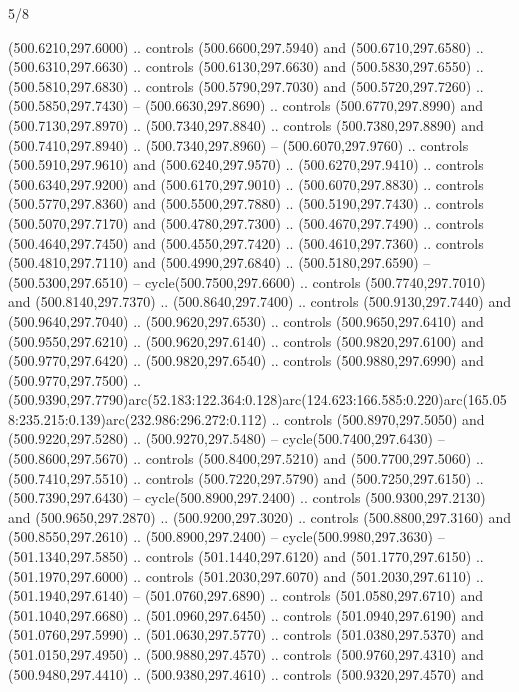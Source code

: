 \begin{flagdescription}{5/8}
\begin{scope}[xshift=0.5\flaglength,yshift=0.5\flagwidth,scale=\flagwidth/475.63]
\begin{scope}[y=0.8pt, x=0.8pt, yscale=-1, xscale=1,shift={(-450,-300)}]
\begin{scope}[cm={{1.0,0.0,0.0,1.0,(-0.0002,0.12556)}},cm={{1.0,0.0,0.0,1.0,(0.00179,0.0)}}]
\begin{scope}[cm={{1.11592,0.0,0.0,1.11592,(-106.89933,-41.77764)}}]
\begin{scope}[draw=black,fill=cfff]
\begin{scope}[fill=black]
  (500.6210,297.6000) .. controls (500.6600,297.5940) and (500.6710,297.6580) ..
  (500.6310,297.6630) .. controls (500.6130,297.6630) and (500.5830,297.6550) ..
  (500.5810,297.6830) .. controls (500.5790,297.7030) and (500.5720,297.7260) ..
  (500.5850,297.7430) -- (500.6630,297.8690) .. controls (500.6770,297.8990) and
  (500.7130,297.8970) .. (500.7340,297.8840) .. controls (500.7380,297.8890) and
  (500.7410,297.8940) .. (500.7340,297.8960) -- (500.6070,297.9760) .. controls
  (500.5910,297.9610) and (500.6240,297.9570) .. (500.6270,297.9410) .. controls
  (500.6340,297.9200) and (500.6170,297.9010) .. (500.6070,297.8830) .. controls
  (500.5770,297.8360) and (500.5500,297.7880) .. (500.5190,297.7430) .. controls
  (500.5070,297.7170) and (500.4780,297.7300) .. (500.4670,297.7490) .. controls
  (500.4640,297.7450) and (500.4550,297.7420) .. (500.4610,297.7360) .. controls
  (500.4810,297.7110) and (500.4990,297.6840) .. (500.5180,297.6590) --
  (500.5300,297.6510) -- cycle(500.7500,297.6600) .. controls
  (500.7740,297.7010) and (500.8140,297.7370) .. (500.8640,297.7400) .. controls
  (500.9130,297.7440) and (500.9640,297.7040) .. (500.9620,297.6530) .. controls
  (500.9650,297.6410) and (500.9550,297.6210) .. (500.9620,297.6140) .. controls
  (500.9820,297.6100) and (500.9770,297.6420) .. (500.9820,297.6540) .. controls
  (500.9880,297.6990) and (500.9770,297.7500) ..
  (500.9390,297.7790)arc(52.183:122.364:0.128)arc(124.623:166.585:0.220)arc(165.058:235.215:0.139)arc(232.986:296.272:0.112)
  .. controls (500.8970,297.5050) and (500.9220,297.5280) .. (500.9270,297.5480)
  -- cycle(500.7400,297.6430) -- (500.8600,297.5670) .. controls
  (500.8400,297.5210) and (500.7700,297.5060) .. (500.7410,297.5510) .. controls
  (500.7220,297.5790) and (500.7250,297.6150) .. (500.7390,297.6430) --
  cycle(500.8900,297.2400) .. controls (500.9300,297.2130) and
  (500.9650,297.2870) .. (500.9200,297.3020) .. controls (500.8800,297.3160) and
  (500.8550,297.2610) .. (500.8900,297.2400) -- cycle(500.9980,297.3630) --
  (501.1340,297.5850) .. controls (501.1440,297.6120) and (501.1770,297.6150) ..
  (501.1970,297.6000) .. controls (501.2030,297.6070) and (501.2030,297.6110) ..
  (501.1940,297.6140) -- (501.0760,297.6890) .. controls (501.0580,297.6710) and
  (501.1040,297.6680) .. (501.0960,297.6450) .. controls (501.0940,297.6190) and
  (501.0760,297.5990) .. (501.0630,297.5770) .. controls (501.0380,297.5370) and
  (501.0150,297.4950) .. (500.9880,297.4570) .. controls (500.9760,297.4310) and
  (500.9480,297.4410) .. (500.9380,297.4610) .. controls (500.9320,297.4570) and

\end{scope}
\end{scope}
\end{scope}
\end{scope}
\end{scope}
\end{scope}
\end{flagdescription}
